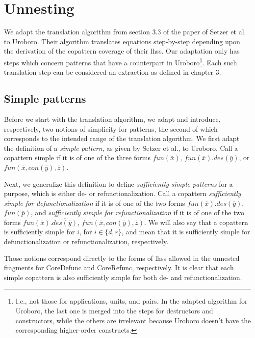 \section{Unnesting}

We adapt the translation algorithm from section 3.3 of the paper of Setzer et al. to Uroboro. Their algorithm translates equations step-by-step depending upon the derivation of the copattern coverage of their lhss. Our adaptation only has steps which concern patterns that have a counterpart in Uroboro\footnote{I.e., not those for applications, units, and pairs. In the adapted algorithm for Uroboro, the last one is merged into the steps for destructors and constructors, while the others are irrelevant because Uroboro doesn't have the corresponding higher-order constructs.}. Each such translation step can be considered an extraction as defined in chapter 3.

\subsection{Simple patterns}

Before we start with the translation algorithm, we adapt and introduce, respectively, two notions of simplicity for patterns, the second of which corresponds to the intended range of the translation algorithm. We first adapt the definition of a \textit{simple pattern}, as given by Setzer et al., to Uroboro. Call a copattern simple if it is of one of the three forms $fun(\overline{x})$, $fun(\overline{x}).des(\overline{y})$, or $fun(\overline{x}, con(\overline{y}), \overline{z})$.

Next, we generalize this definition to define \textit{sufficiently simple patterns} for a purpose, which is either de- or refunctionalization. Call a copattern \textit{sufficiently simple for defunctionalization} if it is of one of the two forms $fun(\overline{x}).des(\overline{y})$, $fun(\overline{p})$, and \textit{sufficiently simple for refunctionalization} if it is of one of the two forms $fun(\overline{x}).\overline{des(\overline{y})}$, $fun(\overline{x}, con(\overline{y}), \overline{z})$. We will also say that a copattern is sufficiently simple for $i$, for $i \in \{d,r\}$, and mean that it is sufficiently simple for defunctionalization or refunctionalization, respectively.

Those notions correspond directly to the forms of lhss allowed in the unnested fragments for \textsf{CoreDefunc} and \textsf{CoreRefunc}, respectively. It is clear that each simple copattern is also sufficiently simple for both de- and refunctionalization.

